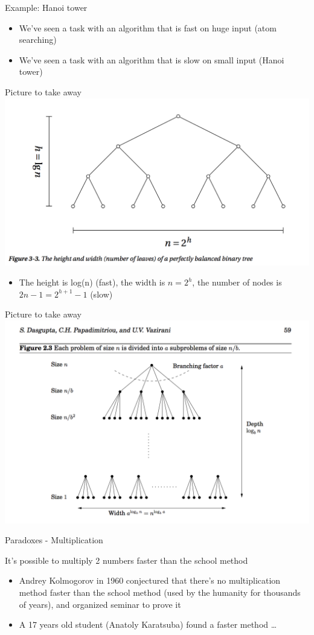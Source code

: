 \documentclass[presentation]{beamer}
\begin{document}
\begin{frame}[label=sec-2-7]{Example: Hanoi tower}
\begin{itemize}
\item We've seen a task with an algorithm that is fast on huge input (atom searching)
\item We've seen a task with an algorithm that is slow on small input (Hanoi tower)
\end{itemize}
\end{frame}
\begin{frame}[label=sec-2-8]{Picture to take away}
\includegraphics[width=.9\linewidth]{./img/bintree.png}
\begin{itemize}
\item The height is \alert{log(n)} (fast), the width is \alert{$n=2^h$}, the number of nodes is \alert{$2n - 1 = 2^{h+1} - 1$} (slow)
\end{itemize}
\end{frame}
\begin{frame}[label=sec-2-9]{Picture to take away}
\includegraphics[width=.9\linewidth]{./img/tree2.png}
\end{frame}
\begin{frame}[label=sec-2-10]{Paradoxes - Multiplication}
\begin{block}{It's possible to multiply 2 numbers faster than the school method}
\begin{itemize}
\item Andrey Kolmogorov in 1960 conjectured that there's no multiplication method faster than the school method (used by the humanity for thousands of years), and organized seminar to prove it
\item A 17 years old student (Anatoly Karatsuba) found a faster method \ldots{}
\end{itemize}
\end{block}
\end{frame}
\end{document}
